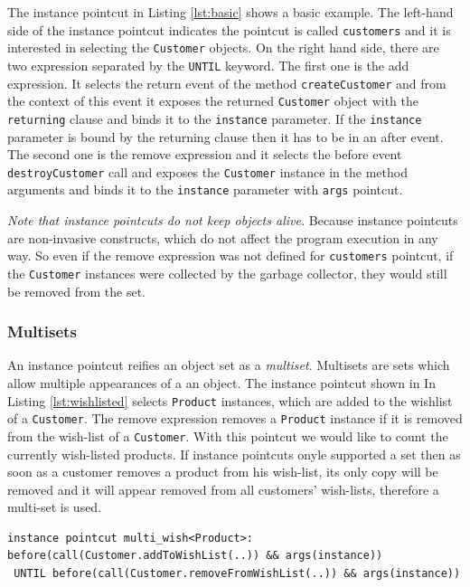 \documentclass{llncs}
\begin{document}
The instance pointcut in Listing \ref{lst:basic} shows a basic example. The left-hand side of the instance pointcut indicates the pointcut is called \texttt{customers} and it is interested in selecting the \texttt{Customer} objects. 
On the right hand side, there are two expression separated by the \texttt{UNTIL} keyword. The first one is the add expression. It selects the return event of the method \texttt{createCustomer} and from the context of this event it exposes the returned \texttt{Customer} object with the \texttt{returning} clause and binds it to the \texttt{instance} parameter. If the \texttt{instance} parameter is bound by the returning clause then it has to be in an after event. The second one is the remove expression and it selects the before event \texttt{destroyCustomer} call and exposes the \texttt{Customer} instance in the method arguments and binds it to the \texttt{instance} parameter with \texttt{args} pointcut.

\emph{Note that instance pointcuts do not keep objects alive.} Because instance pointcuts are non-invasive constructs, which do not affect the program execution in any way. So even if the remove expression was not defined for \texttt{customers} pointcut, if the \texttt{Customer} instances were collected by the garbage collector, they would still be removed from the set. 


\subsubsection{Multisets}
An instance pointcut reifies an object set as a \emph{multiset}. Multisets are sets which allow multiple appearances of a an object. The instance pointcut shown in In Listing \ref{lst:wishlisted} selects \texttt{Product} instances, which are added to the wishlist of a \texttt{Customer}. The remove expression removes a \texttt{Product} instance if it is removed from the wish-list of a \texttt{Customer}. With this pointcut we would like to count the currently wish-listed products. If instance pointcuts onyle supported a set then as soon as a customer removes a product from his wish-list, its only copy will be removed and it will appear removed from all customers' wish-lists, therefore a multi-set is used. 

\begin{lstlisting}[float=h!, caption={An instance pointcut utilizing multiset property}, label={lst:wishlisted}]
instance pointcut multi_wish<Product>: 
before(call(Customer.addToWishList(..)) && args(instance))
 UNTIL before(call(Customer.removeFromWishList(..)) && args(instance))
\end{lstlisting}
\end{document}
